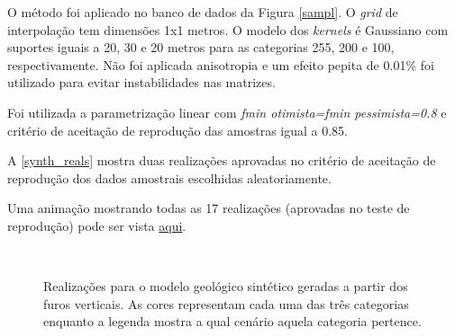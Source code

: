 O método foi aplicado no banco de dados da Figura \autoref{sampl}. O \textit{grid} de interpolação tem dimensões 1x1 metros. O modelo dos \textit{kernels} é Gaussiano com suportes iguais a 20, 30 e 20 metros para as categorias 255, 200 e 100, respectivamente. Não foi aplicada anisotropia e um efeito pepita de 0.01\% foi utilizado para evitar instabilidades nas matrizes.

Foi utilizada a parametrização linear com \textit{fmin otimista=fmin pessimista=0.8} e critério de aceitação de reprodução das amostras igual a 0.85.

A \autoref{synth_reals} mostra duas realizações aprovadas no critério de aceitação de reprodução dos dados amostrais escolhidas aleatoriamente.

Uma animação mostrando todas as 17 realizações (aprovadas no teste de reprodução) pode ser vista \href{https://github.com/robertorolo/kernel_support_parametrization_uncertainty_assess/blob/main/sec_hole_10.gif}{aqui}.

\begin{figure}[H] 
    \centering
    \caption{Realizações para o modelo geológico sintético geradas a partir dos furos verticais. As cores representam cada uma das três categorias enquanto a legenda mostra a qual cenário aquela categoria pertence.} \label{synth_reals}
     \\
\end{figure}

